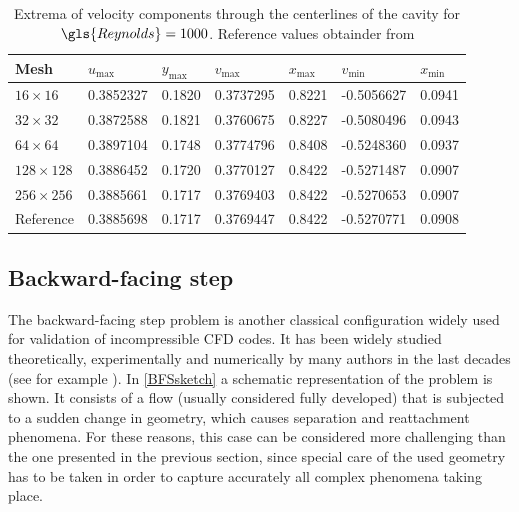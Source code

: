 \begin{table}[]
	\centering
	\begin{tabular}{lllllrr}
		\hline
		Mesh     & $u_{\text{max}}$ & $y_{\text{max}}$ & $v_{\text{max}}$ & $x_{\text{max}}$ & \multicolumn{1}{l}{$v_{\text{min}}$} & \multicolumn{1}{l}{$x_{\text{min}}$} \\ \hline
		$16\times16$        & 0.3852327        & 0.1820           & 0.3737295        & 0.8221           & -0.5056627                           & 0.0941                               \\
		$32\times32$        & 0.3872588        & 0.1821           & 0.3760675        & 0.8227           & -0.5080496                           & 0.0943                               \\
		$64\times64$       & 0.3897104        & 0.1748           & 0.3774796        & 0.8408           & -0.5248360                           & 0.0937                               \\
		$128\times128$       & 0.3886452        & 0.1720           & 0.3770127        & 0.8422           & -0.5271487                           & 0.0907                               \\
		$256\times256$       & 0.3885661        & 0.1717           & 0.3769403        & 0.8422           & -0.5270653                           & 0.0907                               \\
		Reference & 0.3885698        & 0.1717           & 0.3769447        & 0.8422           & \multicolumn{1}{l}{-0.5270771}       & \multicolumn{1}{l}{0.0908}           \\ \hline
	\end{tabular}
	\caption{Extrema of velocity components through the centerlines of the cavity for $\gls{Reynolds} = 1000$. Reference values obtainder from \cite{botellaBenchmarkSpectralResults1998} }
	\label{tab:LidCavityExtrema}
\end{table}
	\FloatBarrier
\newpage

\subsection{Backward-facing step}\label{ssec:BackwardFacingStep}
The backward-facing step problem is another classical configuration widely used for validation of incompressible CFD codes. It has been widely studied theoretically, experimentally and numerically by many authors in the last decades (see for example \cite{armalyExperimentalTheoreticalInvestigation1983,barkleyThreedimensionalInstabilityFlow2000,biswasBackwardFacingStepFlows2004} ).  In \cref{BFSsketch} a schematic representation of the problem is shown. It consists of a flow (usually considered fully developed) that is subjected to a sudden change in geometry, which causes separation and reattachment phenomena. For these reasons, this case can be considered more challenging than the one presented in the previous section, since special care of the used geometry has to be taken in order to capture accurately all complex phenomena taking place.

